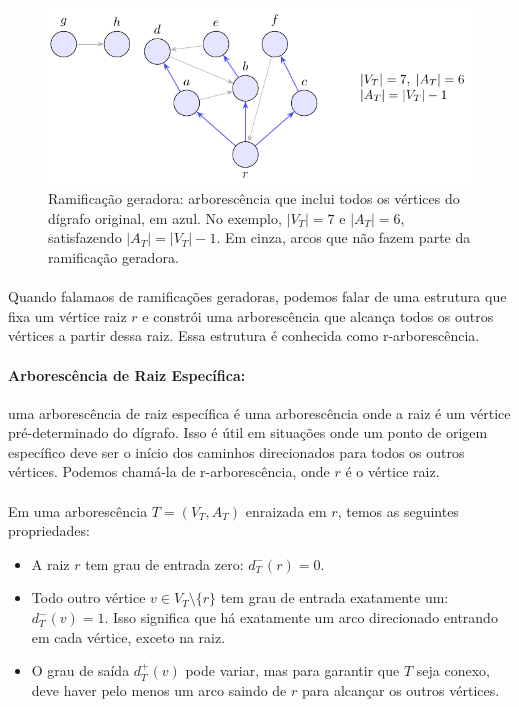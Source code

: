 \documentclass[12pt,a4paper]{article}
\def\emph#1{#1}%
\begin{document}
\begin{figure}[H]
    \centering
    \includegraphics[width=0.9\linewidth]{figures/fig_ramificacao_geradora.pdf}

    \caption{Ramificação geradora: arborescência que inclui todos os vértices do dígrafo original, em azul. No exemplo, $|V_T|=7$ e $|A_T|=6$, satisfazendo $|A_T|=|V_T|-1$. Em cinza, arcos que não fazem parte da ramificação geradora.}
    \label{fig:ramificacao-geradora}\end{figure}
 

\paragraph{}
Quando falamaos de ramificações geradoras, podemos falar de uma estrutura que fixa um vértice raiz \(r\) e constrói uma arborescência que alcança todos os outros vértices a partir dessa raiz. Essa estrutura é conhecida como \emph{r-arborescência}.

\paragraph{Arborescência de Raiz Específica:}
uma arborescência de raiz específica é uma arborescência onde a raiz é um vértice pré-determinado do dígrafo. Isso é útil em situações onde um ponto de origem específico deve ser o início dos caminhos direcionados para todos os outros vértices. Podemos chamá-la de r-arborescência, onde \(r\) é o vértice raiz.

\paragraph{}
Em uma arborescência \(T = (V_T, A_T)\) enraizada em \(r\), temos as seguintes propriedades:
\begin{itemize}
    \item A raiz \(r\) tem grau de entrada zero: \(d_T^-(r) = 0\).
    \item Todo outro vértice \(v \in V_T \setminus \{r\}\) tem grau de entrada exatamente um: \(d_T^-(v) = 1\). Isso significa que há exatamente um arco direcionado entrando em cada vértice, exceto na raiz.
    \item O grau de saída \(d_T^+(v)\) pode variar, mas para garantir que \(T\) seja conexo, deve haver pelo menos um arco saindo de \(r\) para alcançar os outros vértices.
\end{itemize}
\end{document}
